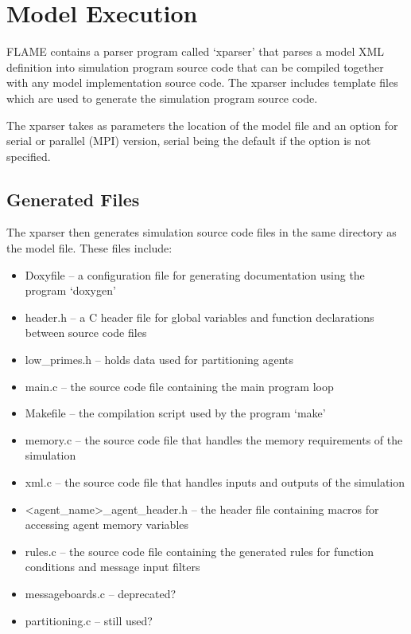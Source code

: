 \section{Model Execution}
\label{model_execution}

FLAME contains a parser program called `xparser' that parses a model
XML definition into simulation program source code that can be compiled
together with any model implementation source code. The xparser includes
template files which are used to generate the simulation program source code.

The xparser takes as parameters the location of the model file and an option
for serial or parallel (MPI) version, serial being the default if the option is
not specified.

\subsection{Generated Files}

The xparser then generates simulation source code files in the same directory
as the model file. These files include:

\begin{itemize}
  \item Doxyfile -- a configuration file for generating documentation using
 the program `doxygen'
  \item header.h -- a C header file for global variables and function
  declarations between source code files
  \item low\_primes.h -- holds data used for partitioning agents
  \item main.c -- the source code file containing the main program loop
  \item Makefile -- the compilation script used by the program `make'
  \item memory.c -- the source code file that handles the memory requirements
  of the simulation
  \item xml.c -- the source code file that handles inputs and outputs of the
  simulation
  \item <agent\_name>\_agent\_header.h -- the header file containing macros for
  accessing agent memory variables
  \item rules.c -- the source code file containing the generated rules for
  function conditions and message input filters
  \item messageboards.c -- deprecated?
  \item partitioning.c -- still used?
\end{itemize}

